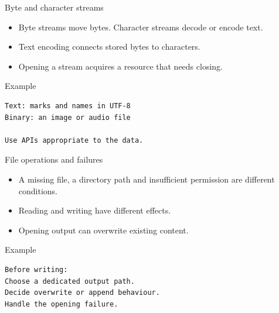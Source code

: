 \documentclass[10pt,aspectratio=169]{beamer}
\begin{document}
\begin{frame}[fragile,t]{Byte and character streams}
\begin{itemize}
\item Byte streams move bytes. Character streams decode or encode text.
\item Text encoding connects stored bytes to characters.
\item Opening a stream acquires a resource that needs closing.
\end{itemize}
\vspace{1mm}\begin{block}{Example}
\begin{lstlisting}
Text: marks and names in UTF-8
Binary: an image or audio file

Use APIs appropriate to the data.
\end{lstlisting}
\end{block}
\end{frame}

\begin{frame}[fragile,t]{File operations and failures}
\begin{itemize}
\item A missing file, a directory path and insufficient permission are different conditions.
\item Reading and writing have different effects.
\item Opening output can overwrite existing content.
\end{itemize}
\vspace{1mm}\begin{block}{Example}
\begin{lstlisting}
Before writing:
Choose a dedicated output path.
Decide overwrite or append behaviour.
Handle the opening failure.
\end{lstlisting}
\end{block}
\end{frame}
\end{document}
